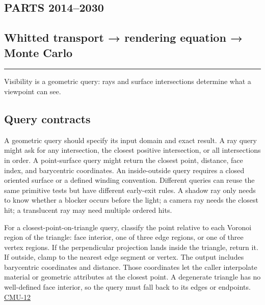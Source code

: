 \subsection{PARTS 2014--2030}\label{04-visual-computing-ii-ch028-parts-20142030}

\subsection{Whitted transport → rendering equation → Monte Carlo}\label{04-visual-computing-ii-ch028-whitted-transport-rendering-equation-monte-carlo}

\begin{center}\rule{0.5\linewidth}{0.5pt}\end{center}

Visibility is a geometric query: rays and surface intersections determine what a viewpoint can see.

\subsection{Query contracts}\label{04-visual-computing-ii-ch028-query-contracts}

A geometric query should specify its input domain and exact result. A ray query might ask for any intersection, the closest positive intersection, or all intersections in order. A point-surface query might return the closest point, distance, face index, and barycentric coordinates. An inside-outside query requires a closed oriented surface or a defined winding convention. Different queries can reuse the same primitive tests but have different early-exit rules. A shadow ray only needs to know whether a blocker occurs before the light; a camera ray needs the closest hit; a translucent ray may need multiple ordered hits.

For a closest-point-on-triangle query, classify the point relative to each Voronoi region of the triangle: face interior, one of three edge regions, or one of three vertex regions. If the perpendicular projection lands inside the triangle, return it. If outside, clamp to the nearest edge segment or vertex. The output includes barycentric coordinates and distance. Those coordinates let the caller interpolate material or geometric attributes at the closest point. A degenerate triangle has no well-defined face interior, so the query must fall back to its edges or endpoints. \hyperref[04-visual-computing-ii-ch036-cmu-12---geometric-queries]{CMU-12}

